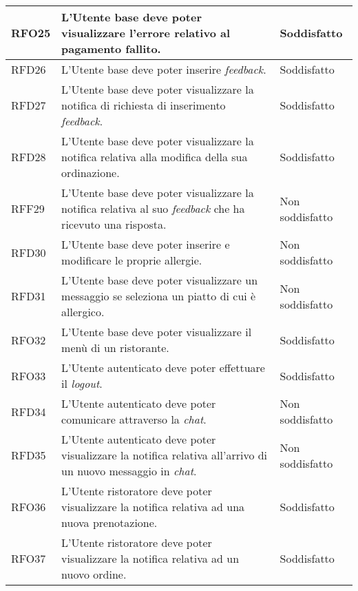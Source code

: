 \begin{longtable}{|l|p{}|p{3cm}|}
	\hline
	RFO25       & L'Utente base deve poter visualizzare l'errore relativo al pagamento fallito.                                  		& Soddisfatto                                                                \\
	\hline
	RFD26       & L'Utente base deve poter inserire \textit{feedback}.																	& Soddisfatto                                                     \\
	\hline
	RFD27       & L'Utente base deve poter visualizzare la notifica di richiesta di inserimento \textit{feedback}.                     	& Soddisfatto       \\
	\hline
	RFD28       & L'Utente base deve poter visualizzare la notifica relativa alla modifica della sua ordinazione.                      	& Soddisfatto       \\
	\hline
	RFF29       & L'Utente base deve poter visualizzare la notifica relativa al suo \textit{feedback} che ha ricevuto una risposta.    	& Non soddisfatto   \\
	\hline
	RFD30       & L'Utente base deve poter inserire e modificare le proprie allergie.                                                  	& Non soddisfatto	\\
	\hline
	RFD31       & L'Utente base deve poter visualizzare un messaggio se seleziona un piatto di cui è allergico.                        	& Non soddisfatto   \\
	\hline
	RFO32       & L'Utente base deve poter visualizzare il menù di un ristorante.                                                      	& Soddisfatto       \\
	\hline
	RFO33       & L'Utente autenticato deve poter effettuare il \textit{logout}.                                                       	& Soddisfatto       \\
	\hline
	RFD34       & L'Utente autenticato deve poter comunicare attraverso la \textit{chat}.                                              	& Non soddisfatto   \\
	\hline
	RFD35       & L'Utente autenticato deve poter visualizzare la notifica relativa all'arrivo di un nuovo messaggio in \textit{chat}. 	& Non soddisfatto   \\
	\hline
	RFO36       & L'Utente ristoratore deve poter visualizzare la notifica relativa ad una nuova prenotazione.                         	& Soddisfatto		\\
	\hline
	RFO37       & L'Utente ristoratore deve poter visualizzare la notifica relativa ad un nuovo ordine.                                	& Soddisfatto		\\

\end{longtable}

